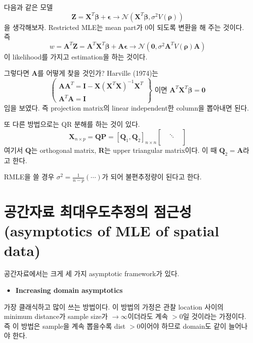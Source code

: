 \documentclass[b5paper,]{book}
\providecommand{\tightlist}{%
  \setlength{\itemsep}{0pt}\setlength{\parskip}{0pt}}
\theoremstyle{definition}
\theoremstyle{definition}
\theoremstyle{definition}
\theoremstyle{remark}
\begin{document}
다음과 같은 모델
\[\mathbf{Z}=\mathbf{X}^{T}\boldsymbol{\beta}+\boldsymbol{\epsilon} \rightarrow \mathcal{N}(\mathbf{X}^{T}\boldsymbol{\beta}, \sigma^{2}V(\boldsymbol{\rho}))\]
을 생각해보자. Restricted MLE는 mean part가 0이 되도록 변환을 해 주는
것이다. 즉
\[w=\mathbf{A}^{T}\mathbf{Z}=\mathbf{A}^{T}\mathbf{X}^{T}\boldsymbol{\beta}+\mathbf{A}\boldsymbol{\epsilon} \rightarrow \mathcal{N}(\mathbf{0},\sigma^{2}\mathbf{A}^{T}V(\boldsymbol{\rho})\mathbf{A})\]
이 likelihood를 가지고 estimation을 하는 것이다.

그렇다면 \(\mathbf{A}\)를 어떻게 찾을 것인가? Harville (1974)는 \[
\left(\begin{array}{l}
\mathbf{A}\mathbf{A}^{T}=\mathbf{I}-\mathbf{X}(\mathbf{X}^{T}\mathbf{X})^{-1}\mathbf{X}^{T}\\
\mathbf{A}^{T}\mathbf{A}=\mathbf{I}
\end{array}
\right\} \text{ 이면 } \mathbf{A}^{T}\mathbf{X}^{T}\boldsymbol{\beta}=\mathbf{0}
\] 임을 보였다. 즉 projection matrix의 linear independent한 column을
뽑아내면 된다.

또 다른 방법으로는 QR 분해를 하는 것이 있다. \[
\mathbf{X}_{n\times p}=\mathbf{Q}\mathbf{P}=[\mathbf{Q}_{1}, \mathbf{Q}_{2}]_{n\times n}
\begin{bmatrix}
 &  &  \\
 & \ddots &  \\
 &  & \\
\end{bmatrix}
\] 여기서 \(\mathbf{Q}\)는 orthogonal matrix, \(\mathbf{R}\)는 upper
triangular matrix이다. 이 때 \(\mathbf{Q}_{2}=\mathbf{A}\)라고 한다.

RMLE을 쓸 경우 \(\sigma^{2}=\frac{1}{n-p}( \cdots )\)가 되어
불편추정량이 된다고 한다.

\section{공간자료 최대우도추정의 점근성(asymptotics of MLE of spatial
data)}\label{--asymptotics-of-mle-of-spatial-data}

공간자료에서는 크게 세 가지 asymptotic framework가 있다.

\begin{itemize}
\tightlist
\item
  \textbf{Increasing domain asymptotics}
\end{itemize}

가장 클래식하고 많이 쓰는 방법이다. 이 방법의 가정은 관찰 location
사이의 minimum distance가 sample size가 \(\rightarrow \infty\)이더라도
계속 \(>0\)일 것이라는 가정이다. 즉 이 방법은 sample을 계속 뽑을수록
dist \(>0\)이어야 하므로 domain도 같이 늘어나야 한다.
\end{document}
